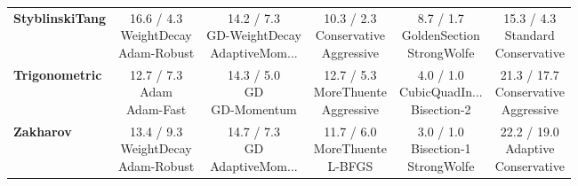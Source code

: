 \documentclass[10pt]{article}
\begin{document}
\begin{longtable}{lccccc}
\textbf{StyblinskiTang} & \cellcolor{red!15} \makecell{16.6 / 4.3 \\ \scriptsize{WeightDecay} \\ \scriptsize{Adam-Robust}}&  \makecell{14.2 / 7.3 \\ \scriptsize{GD-WeightDecay} \\ \scriptsize{AdaptiveMom...}}&  \makecell{10.3 / 2.3 \\ \scriptsize{Conservative} \\ \scriptsize{Aggressive}}& \cellcolor{green!20} \makecell{8.7 / 1.7 \\ \scriptsize{GoldenSection} \\ \scriptsize{StrongWolfe}}&  \makecell{15.3 / 4.3 \\ \scriptsize{Standard} \\ \scriptsize{Conservative}} \\
\textbf{Trigonometric} &  \makecell{12.7 / 7.3 \\ \scriptsize{Adam} \\ \scriptsize{Adam-Fast}}&  \makecell{14.3 / 5.0 \\ \scriptsize{GD} \\ \scriptsize{GD-Momentum}}&  \makecell{12.7 / 5.3 \\ \scriptsize{MoreThuente} \\ \scriptsize{Aggressive}}& \cellcolor{green!20} \makecell{4.0 / 1.0 \\ \scriptsize{CubicQuadIn...} \\ \scriptsize{Bisection-2}}& \cellcolor{red!15} \makecell{21.3 / 17.7 \\ \scriptsize{Conservative} \\ \scriptsize{Aggressive}} \\
\textbf{Zakharov} &  \makecell{13.4 / 9.3 \\ \scriptsize{WeightDecay} \\ \scriptsize{Adam-Robust}}&  \makecell{14.7 / 7.3 \\ \scriptsize{GD} \\ \scriptsize{AdaptiveMom...}}&  \makecell{11.7 / 6.0 \\ \scriptsize{MoreThuente} \\ \scriptsize{L-BFGS}}& \cellcolor{green!20} \makecell{3.0 / 1.0 \\ \scriptsize{Bisection-1} \\ \scriptsize{StrongWolfe}}& \cellcolor{red!15} \makecell{22.2 / 19.0 \\ \scriptsize{Adaptive} \\ \scriptsize{Conservative}} \\
\end{longtable}
\end{document}
